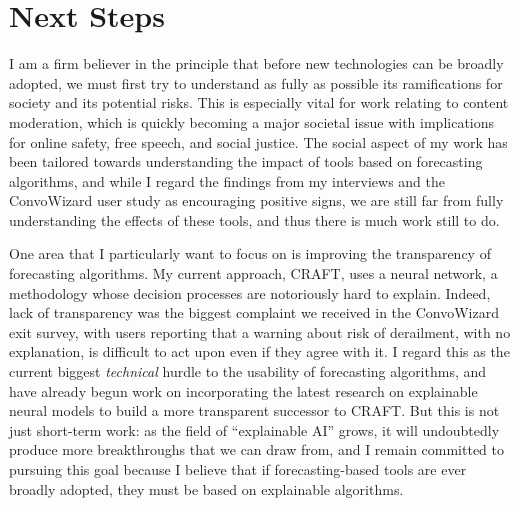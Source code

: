 \documentclass[11pt,letterpaper]{article}
\begin{document}
\section{Next Steps}
I am a firm believer in the principle that before new technologies can be broadly adopted, we must first try to understand as fully as possible its ramifications for society and its potential risks.
This is especially vital for work relating to content moderation, which is quickly becoming a major societal issue with implications for online safety, free speech, and social justice.
The social aspect of my work has been tailored towards understanding the impact of tools based on forecasting algorithms, and while I regard the findings from my interviews and the ConvoWizard user study as encouraging positive signs, we are still far from fully understanding the effects of these tools, and thus there is much work still to do.

One area that I particularly want to focus on is improving the transparency of forecasting algorithms.
My current approach, CRAFT, uses a neural network, a methodology whose decision processes are notoriously hard to explain.
Indeed, lack of transparency was the biggest complaint we received in the ConvoWizard exit survey, with users reporting that a warning about risk of derailment, with no explanation, is difficult to act upon even if they agree with it.
I regard this as the current biggest \emph{technical} hurdle to the usability of forecasting algorithms, and have already begun work on incorporating the latest research on explainable neural models to build a more transparent successor to CRAFT.
But this is not just short-term work: as the field of ``explainable AI'' grows, it will undoubtedly produce more breakthroughs that we can draw from, and I remain committed to pursuing this goal because I believe that if forecasting-based tools are ever broadly adopted, they must be based on explainable algorithms.
\end{document}
